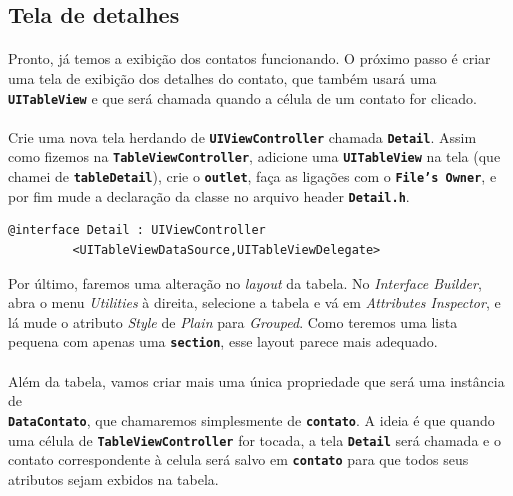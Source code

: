 \documentclass[a4paper,12pt,brazil,doubleside]{book}
\begin{document}
\pagebreak

\subsection{Tela de detalhes}

\paragraph{}Pronto, já temos a exibição dos contatos funcionando. O próximo passo é criar uma tela de exibição dos detalhes do contato, que também usará uma \texttt{\textbf{UITableView}} e que será chamada quando a célula de um contato for clicado.
\paragraph{}Crie uma nova tela herdando de \texttt{\textbf{UIViewController}} chamada \texttt{\textbf{Detail}}. Assim como fizemos na \texttt{\textbf{TableViewController}}, adicione uma \texttt{\textbf{UITableView}} na tela (que chamei de \texttt{\textbf{tableDetail}}), crie o \texttt{\textbf{outlet}}, faça as ligações com o \texttt{\textbf{File's Owner}}, e por fim mude a declaração da classe no arquivo header \texttt{\textbf{Detail.h}}.

\begin{listing}
\begin{verbatim}
@interface Detail : UIViewController
         <UITableViewDataSource,UITableViewDelegate>
\end{verbatim}
\end{listing}

Por último, faremos uma alteração no \emph{layout} da tabela. No \emph{Interface Builder}, abra o menu \emph{Utilities} à direita, selecione a tabela e vá em \emph{Attributes Inspector}, e lá mude o atributo \emph{Style} de \emph{Plain} para \emph{Grouped}. Como teremos uma lista pequena com apenas uma \texttt{\textbf{section}}, esse layout parece mais adequado.
\paragraph{}Além da tabela, vamos criar mais uma única propriedade que será uma instância de\\
\texttt{\textbf{DataContato}}, que chamaremos simplesmente de \texttt{\textbf{contato}}. A ideia é que quando uma célula de \texttt{\textbf{TableViewController}} for tocada, a tela \texttt{\textbf{Detail}} será chamada e o contato correspondente à celula será salvo em \texttt{\textbf{contato}} para que todos seus atributos sejam exbidos na tabela.
\end{document}
